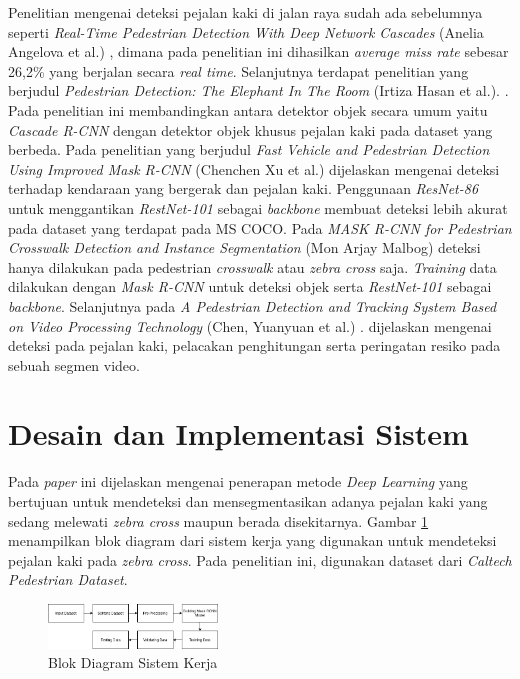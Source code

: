 \documentclass[conference]{IEEEtran}
\begin{document}
	Penelitian mengenai deteksi pejalan kaki di jalan raya sudah ada sebelumnya seperti \textit{Real-Time Pedestrian Detection With Deep Network Cascades} (Anelia Angelova et al.) \cite{cit:1}, dimana pada penelitian ini dihasilkan \textit{average miss rate} sebesar 26,2\% yang berjalan secara \textit{real time}. Selanjutnya terdapat penelitian yang berjudul \textit{Pedestrian Detection: The Elephant In The Room} (Irtiza Hasan et al.). \cite{cit:2}. Pada penelitian ini membandingkan antara detektor objek secara umum yaitu \textit{Cascade R-CNN} dengan detektor objek khusus pejalan kaki pada dataset yang berbeda. Pada penelitian yang berjudul \textit{Fast Vehicle and Pedestrian Detection Using Improved Mask R-CNN} (Chenchen Xu et al.) \cite{cit:3} dijelaskan mengenai deteksi terhadap kendaraan yang bergerak dan pejalan kaki. Penggunaan \textit{ResNet-86} untuk menggantikan \textit{RestNet-101} sebagai \textit{backbone} membuat deteksi lebih akurat pada dataset yang terdapat pada MS COCO. Pada \textit{MASK R-CNN for Pedestrian Crosswalk Detection and Instance Segmentation} (Mon Arjay Malbog) \cite{cit:4} deteksi hanya dilakukan pada pedestrian \textit{crosswalk} atau \textit{zebra cross} saja. \textit{Training} data dilakukan dengan \textit{Mask R-CNN }untuk deteksi objek serta \textit{RestNet-101} sebagai \textit{backbone}. Selanjutnya pada \textit{A Pedestrian Detection and Tracking System Based on Video Processing Technology} (Chen, Yuanyuan et al.) \cite{cit:5}. dijelaskan mengenai deteksi pada pejalan kaki, pelacakan penghitungan serta peringatan resiko pada sebuah segmen video. 
	
	\section{Desain dan Implementasi Sistem}
	\vspace{1ex}
	Pada \textit{paper} ini dijelaskan mengenai penerapan metode \textit{Deep Learning} yang bertujuan untuk mendeteksi dan mensegmentasikan adanya pejalan kaki yang sedang melewati \textit{zebra cross} maupun berada disekitarnya. Gambar \ref{fig:1} menampilkan blok diagram dari sistem kerja yang digunakan untuk mendeteksi pejalan kaki pada \textit{zebra cross}. Pada penelitian ini, digunakan dataset dari \textit{Caltech Pedestrian Dataset}.
	\vspace{1ex}
	\begin{figure}[!ht] \centering
		\includegraphics[width=0.4\textwidth]{img/blok-diagram.png}
		\caption{Blok Diagram Sistem Kerja}
		\label{fig:1}
	\end{figure}
\end{document}
